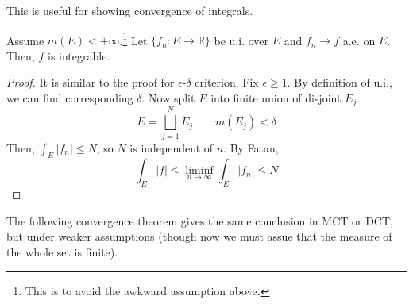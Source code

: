   This is useful for showing convergence of integrals. 

  \begin{lemma} 
    Assume $m(E) < +\infty$.\footnote{This is to avoid the awkward assumption above.} Let $\{f_n: E \to \mathbb{R}\}$ be u.i. over $E$ and $f_n \to f$ a.e. on $E$. Then, $f$ is integrable. 
  \end{lemma}
  \begin{proof}
    It is similar to the proof for $\epsilon$-$\delta$ criterion. Fix $\epsilon \geq 1$. By definition of u.i., we can find corresponding $\delta$. Now split $E$ into finite union of disjoint $E_j$. 
    \begin{equation}
      E = \bigsqcup_{j=1}^N E_j \qquad m(E_j) < \delta
    \end{equation}
    Then, $\int_E |f_n| \leq N$, so $N$ is independent of $n$. By Fatau, 
    \begin{equation}
      \int_E |f| \leq \liminf_{n \to \infty} \int_E |f_n| \leq N
    \end{equation}
  \end{proof}

  The following convergence theorem gives the same conclusion in MCT or DCT, but under weaker assumptions (though now we must assue that the measure of the whole set is finite). 

